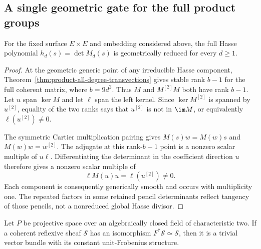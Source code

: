 \subsection{A single geometric gate for the full product groups}
\label{subsec:product-irreducible-hasse-reduction}

\begin{proposition}\label{prop:product-hasse-reduced}
For the fixed surface $E\times E$ and embedding considered above,
the full Hasse polynomial $h_d(s)=\det M_d(s)$ is geometrically
reduced for every $d\ge1$.
\end{proposition}

\begin{proof}
At the geometric generic point of any irreducible Hasse component,
Theorem~\ref{thm:product-all-degree-transvections} gives stable rank
$b-1$ for the full coherent matrix, where $b=9d^2$.
Thus $M$ and $M^{[2]}M$ both have rank $b-1$.
Let $u$ span $\ker M$ and let $\ell$ span the left kernel.
Since $\ker M^{[2]}$ is spanned by $u^{[2]}$, equality of the two
ranks says that $u^{[2]}$ is not in $\im M$, or equivalently
$\ell(u^{[2]})\ne0$.

The symmetric Cartier multiplication pairing gives
$M(s)w=M(w)s$ and $M(w)w=w^{[2]}$.
The adjugate at this rank-$b-1$ point is a nonzero scalar multiple
of $u\ell$.  Differentiating the determinant in the coefficient
direction $u$ therefore gives a nonzero scalar multiple of
\[
                     \ell M(u)u=\ell(u^{[2]})\ne0.
\]
Each component is consequently generically smooth and occurs
with multiplicity one.  The repeated factors in some retained
pencil determinants reflect tangency of those pencils, not a
nonreduced global Hasse divisor.
\end{proof}

\begin{lemma}
\label{lem:periodic-reflexive-projective-trivial}
Let $P$ be projective space over an algebraically closed field of
characteristic two.  If a coherent reflexive sheaf $\mathcal S$
has an isomorphism $F^*\mathcal S\simeq\mathcal S$, then it is a
trivial vector bundle with its constant unit-Frobenius structure.
\end{lemma}

